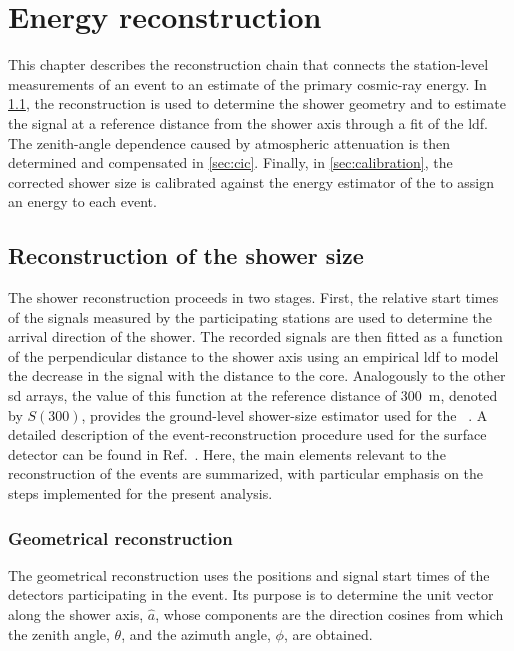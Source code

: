 \documentclass[main.tex]{subfiles}
\begin{document}
\chapter{Energy reconstruction}
\label{chap:energy_reconstruction}
\label{chapter:reconstruction}

This chapter describes the reconstruction chain that connects the station-level measurements of an event to an estimate of the primary cosmic-ray energy.
In \cref{sec:reconstruction_shower_size}, the \Offline reconstruction is used to determine the shower geometry and to estimate the signal at a reference distance from the shower axis through a fit of the \gls{ldf}.
The zenith-angle dependence caused by atmospheric attenuation is then determined and compensated in \cref{sec:cic}.
Finally, in \cref{sec:calibration}, the corrected shower size is calibrated against the energy estimator of the  to assign an energy to each  event.

\section{Reconstruction of the shower size}
\label{sec:reconstruction_shower_size}

The shower reconstruction proceeds in two stages.
First, the relative start times of the signals measured by the participating stations are used to determine the arrival direction of the shower.
The recorded signals are then fitted as a function of the perpendicular distance to the shower axis using an empirical \gls{ldf} to model the decrease in the signal with the distance to the core.
Analogously to the other \gls{sd} arrays, the value of this function at the reference distance of \SI{300}{\m}, denoted by $S(300)$, provides the ground-level shower-size estimator used for the ~\cite{Silli:2021:PerformanceSD433}.
A detailed description of the event-reconstruction procedure used for the surface detector can be found in Ref.~\cite{PierreAuger:2020:SDReconstruction}.
Here, the main elements relevant to the reconstruction of the  events are summarized, with particular emphasis on the steps implemented for the present analysis.

\subsection{Geometrical reconstruction}
\label{subsec:geometry_ldf}

The geometrical reconstruction uses the positions and signal start times of the detectors participating in the event.
Its purpose is to determine the unit vector along the shower axis, $\hat{a}$, whose components are the direction cosines from which the zenith angle, $\theta$, and the azimuth angle, $\phi$, are obtained. 
\end{document}
